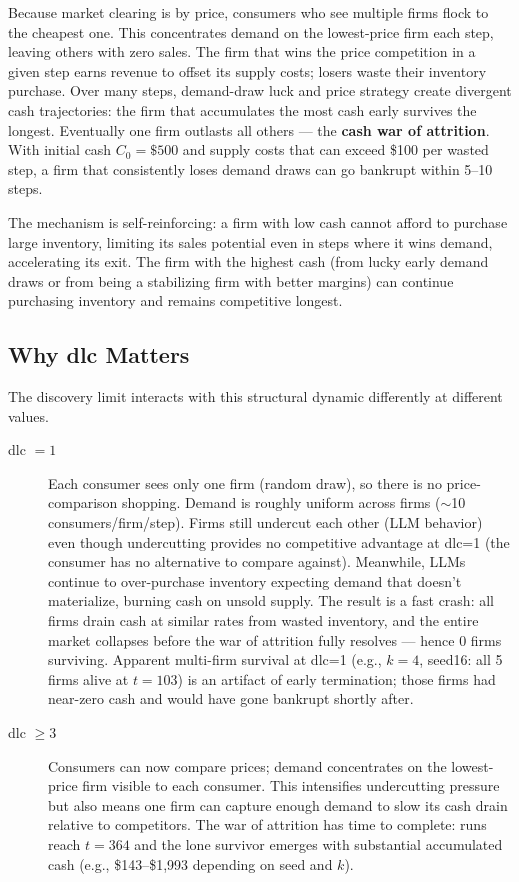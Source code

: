 \documentclass{article}
\begin{document}
Because market clearing is by price, consumers who see multiple firms flock to the cheapest one. This concentrates demand on the lowest-price firm each step, leaving others with zero sales. The firm that wins the price competition in a given step earns revenue to offset its supply costs; losers waste their inventory purchase. Over many steps, demand-draw luck and price strategy create divergent cash trajectories: the firm that accumulates the most cash early survives the longest. Eventually one firm outlasts all others --- the \textbf{cash war of attrition}. With initial cash \(C_0 = \$500\) and supply costs that can exceed \$100 per wasted step, a firm that consistently loses demand draws can go bankrupt within 5--10 steps.

The mechanism is self-reinforcing: a firm with low cash cannot afford to purchase large inventory, limiting its sales potential even in steps where it wins demand, accelerating its exit. The firm with the highest cash (from lucky early demand draws or from being a stabilizing firm with better margins) can continue purchasing inventory and remains competitive longest.

\subsection{Why dlc Matters}

The discovery limit interacts with this structural dynamic differently at different values.

\begin{description}
  \item[dlc $= 1$] Each consumer sees only one firm (random draw), so there is no price-comparison shopping. Demand is roughly uniform across firms ($\sim$10 consumers/firm/step). Firms still undercut each other (LLM behavior) even though undercutting provides no competitive advantage at dlc=1 (the consumer has no alternative to compare against). Meanwhile, LLMs continue to over-purchase inventory expecting demand that doesn't materialize, burning cash on unsold supply. The result is a fast crash: all firms drain cash at similar rates from wasted inventory, and the entire market collapses before the war of attrition fully resolves --- hence 0 firms surviving. Apparent multi-firm survival at dlc=1 (e.g., \(k=4\), seed16: all 5 firms alive at \(t=103\)) is an artifact of early termination; those firms had near-zero cash and would have gone bankrupt shortly after.

  \item[dlc $\geq 3$] Consumers can now compare prices; demand concentrates on the lowest-price firm visible to each consumer. This intensifies undercutting pressure but also means one firm can capture enough demand to slow its cash drain relative to competitors. The war of attrition has time to complete: runs reach $t=364$ and the lone survivor emerges with substantial accumulated cash (e.g., \$143--\$1,993 depending on seed and $k$).
\end{description}
\end{document}
